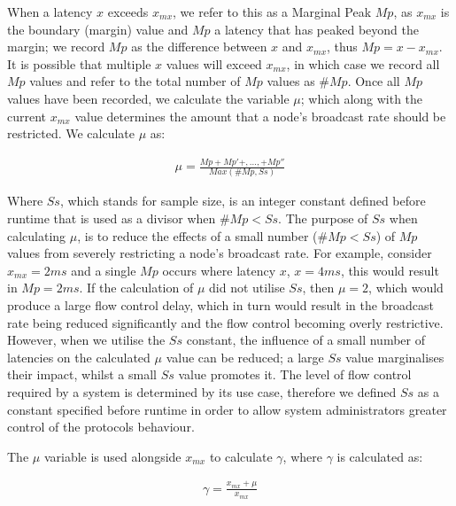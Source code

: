    When a latency $x$ exceeds $x_{mx}$, we refer to this as a Marginal Peak $Mp$, as $x_{mx}$ is the boundary (margin) value and $Mp$ a latency that has peaked beyond the margin; we record $Mp$ as the difference between $x$ and $x_{mx}$, thus $Mp = x - x_{mx}$.  It is possible that multiple $x$ values will exceed $x_{mx}$, in which case we record all $Mp$ values and refer to the total number of $Mp$ values as $\#Mp$.   Once all $Mp$ values have been recorded, we calculate the variable $\mu$; which along with the current $x_{mx}$ value determines the amount that a node's broadcast rate should be restricted.  We calculate $\mu$ as:
    
    \begin{equation*}
		     \begin{aligned}
		         \mu = \frac{Mp + Mp'+,\ldots,+ Mp''}{Max(\#Mp, Ss)}
		     \end{aligned}
    \end{equation*} 
    
    Where $Ss$, which stands for sample size, is an integer constant defined before runtime that is used as a divisor when $\#Mp < Ss$.  The purpose of $Ss$ when calculating $\mu$, is to reduce the effects of a small number ($\#Mp < Ss$) of $Mp$ values from severely restricting a node's broadcast rate.  For example, consider  $x_{mx} = 2ms$ and a single $Mp$ occurs where latency $x$, $x = 4ms$, this would result in $Mp = 2ms$.  If the calculation of $\mu$ did not utilise $Ss$, then $\mu = 2$, which would produce a large flow control delay, which in turn would result in the broadcast rate being reduced significantly and the flow control becoming overly restrictive.  However, when we utilise the $Ss$ constant, the influence of a small number of latencies on the calculated $\mu$ value can be reduced; a large $Ss$ value marginalises their impact, whilst a small $Ss$ value promotes it.  The level of flow control required by a system is determined by its use case, therefore we defined $Ss$ as a constant specified before runtime in order to allow system administrators greater control of the protocols behaviour.  
    
    The $\mu$ variable is used alongside $x_{mx}$ to calculate $\gamma$, where $\gamma$ is calculated as:
    
    \begin{equation*}
		     \begin{aligned}
		         \gamma = \frac{x_{mx} + \mu}{x_{mx}}
		     \end{aligned}
    \end{equation*} 
    
